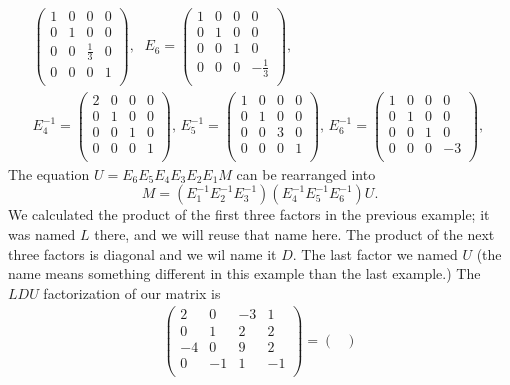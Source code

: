 \begin{example}
\begin{eqnarray*}
\begin{pmatrix}
1&0&0&0\\
0&1&0&0\\
0&0&\frac13&0\\
0&0&0&1\\
\end{pmatrix} , \, ~~
E_6=
\begin{pmatrix}
1&0&0&0\\
0&1&0&0\\
0&0&1&0\\
0&0&0&-\frac13\\
\end{pmatrix} , \, 
\\
E_4^{-1}=
\begin{pmatrix}
2&0&0&0\\
0&1&0&0\\
0&0&1&0\\
0&0&0&1\\
\end{pmatrix} , \, 
E_5^{-1}=
\begin{pmatrix}
1&0&0&0\\
0&1&0&0\\
0&0&3&0\\
0&0&0&1\\
\end{pmatrix} , \, 
E_6^{-1}=
\begin{pmatrix}
1&0&0&0\\
0&1&0&0\\
0&0&1&0\\
0&0&0&-3\\
\end{pmatrix} , \, 
\end{eqnarray*}
The equation $U=E_6E_5E_4E_3E_2E_1 M$ can be rearranged into  
\[M=(E_1^{-1}E_2^{-1}E_3^{-1})(E_4^{-1}E_5^{-1}E_6^{-1})U.\] 
We calculated the product of the first three factors in the previous example; it was named $L$ there, and we will reuse that name here. The product of the next three factors is diagonal and we wil name it $D$. The last factor we named $U$ (the name means something different in this example than the last example.) The $LDU$ factorization of our matrix is
\begin{eqnarray*}
\begin{pmatrix}
2&0&-3&1\\
0&1&2&2\\
-4&0&9&2\\
0&-1&1&-1\\
\end{pmatrix}
=
\begin{pmatrix}

\end{pmatrix}
\end{eqnarray*}
\end{example}
